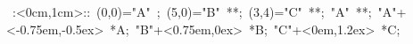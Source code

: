 
\hbox{
\xy    <1cm,0cm>:<0cm,1cm>::
       (0,0)="A" ; (5,0)="B" **\dir{-}; 
       (3,4)="C" **\dir{-}; "A" **\dir{-};
       "A"+<-0.75em,-0.5ex> *{A};
       "B"+<0.75em,0ex> *{B};
       "C"+<0em,1.2ex> *{C};
       \endxy}
	   
